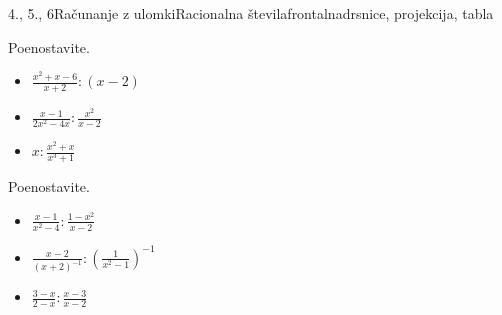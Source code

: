\begin{priprava}{4., 5., 6}{}{Računanje z ulomki}{Racionalna števila}{frontalna}{drsnice, projekcija, tabla}
    \begin{naloga}
        Poenostavite.
        \begin{itemize}
            \item $\frac{x^2+x-6}{x+2}:(x-2)$ 
            \item $\frac{x-1}{2x^2-4x}:\frac{x^2}{x-2}$ 
            \item $x:\frac{x^2+x}{x^3+1}$ 
        \end{itemize}
    \end{naloga}



    \begin{naloga}
        Poenostavite.
        \begin{itemize}
            \item $\frac{x-1}{x^2-4}:\frac{1-x^2}{x-2}$ 
            \item $\frac{x-2}{(x+2)^{-1}}:\left(\frac{1}{x^2-1}\right)^{-1}$ 
            \item $\frac{3-x}{2-x}:\frac{x-3}{x-2}$ 
        \end{itemize}
    \end{naloga}



\end{priprava}